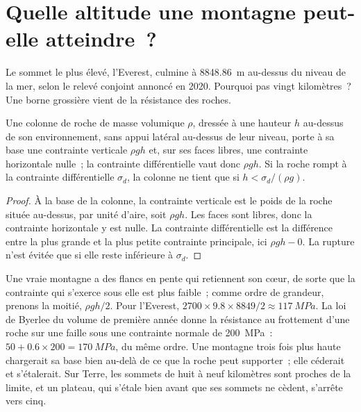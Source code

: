 \section{Quelle altitude une montagne peut-elle atteindre~?}\label{sec:b2:himalaya-andes:heights}

Le sommet le plus élevé, l'Everest, culmine à \qty{8848.86}{m} au-dessus du niveau de la mer, selon le relevé
conjoint annoncé en 2020. Pourquoi pas vingt kilomètres~? Une borne grossière vient de la résistance des roches.

\begin{proposition}\label{prop:b2:himalaya-andes:height}
Une colonne de roche de masse volumique $\rho$, dressée à une hauteur $h$ au-dessus de son environnement,
sans appui latéral au-dessus de leur niveau, porte à sa base une contrainte verticale $\rho g h$ et, sur
ses faces libres, une contrainte horizontale nulle~; la contrainte différentielle vaut donc $\rho g h$. Si
la roche rompt à la contrainte différentielle $\sigma_d$, la colonne ne tient que si $h < \sigma_d/(\rho
g)$.
\end{proposition}

\begin{proof}
À la base de la colonne, la contrainte verticale est le poids de la roche située au-dessus, par
unité d'aire, soit $\rho g h$. Les faces sont libres, donc la contrainte horizontale y est nulle.
La contrainte différentielle est la différence entre la plus grande et la plus petite contrainte
principale, ici $\rho g h - 0$. La rupture n'est évitée que si elle reste inférieure à $\sigma_d$.
\end{proof}

Une vraie montagne a des flancs en pente qui retiennent son cœur, de sorte
que la contrainte qui s'exerce sous elle est plus faible~; comme ordre de
grandeur, prenons la moitié, $\rho g h/2$. Pour l'Everest, $2700 \times 9.8
\times 8849/2 \approx \qty{117}{MPa}$. La loi de Byerlee du volume de première année donne la résistance au
frottement d'une roche sur une faille sous une contrainte normale de \qty{200}{MPa}~: $50 + 0.6 \times 200 =
\qty{170}{MPa}$, du même ordre. Une montagne trois fois plus haute chargerait sa base bien au-delà de ce que
la roche peut supporter~; elle céderait et s'étalerait. Sur Terre, les sommets de huit à neuf kilomètres sont
proches de la limite, et un plateau, qui s'étale bien avant que ses sommets ne cèdent, s'arrête vers cinq.

